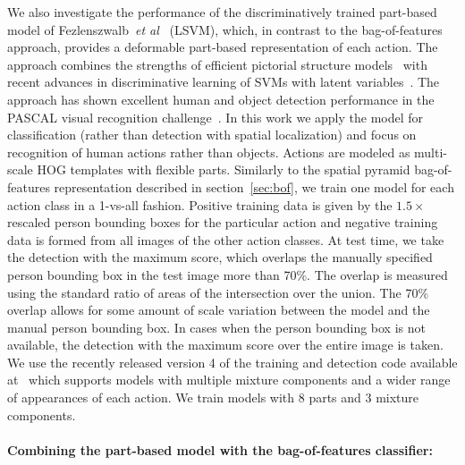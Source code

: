 \documentclass{bmvc2k}
\def\etal{\emph{et al}\bmvaOneDot}
\newcommand{\parnspc}{\vspace*{-4.2mm}}     %
\begin{document}
We also investigate the performance of the discriminatively trained part-based model
of Fezlenszwalb~\etal~\cite{Felzenszwalb09} (LSVM), which, in contrast to the bag-of-features approach,
provides a deformable part-based representation of each action. The approach combines
the strengths of efficient pictorial structure models~\cite{Felzenszwalb05,Fischler73} with
recent advances in discriminative learning of  SVMs with latent variables~\cite{Felzenszwalb09,Yu09a}. 
The approach has shown excellent human and object detection performance in the PASCAL visual recognition challenge~\cite{Felzenszwalb09}. In this work we apply the model for classification (rather than detection with spatial localization) and focus on recognition of human actions rather than objects.  Actions are modeled as multi-scale HOG templates with flexible parts. Similarly to the spatial pyramid bag-of-features representation described in section~\ref{sec:bof}, we train one model for each action class in a 1-vs-all fashion. Positive training
data is given by the $1.5\times$ rescaled person bounding boxes for the particular action and 
negative training data is formed from all images of the other action classes.
At test time, we take the detection with the maximum
score, which overlaps the manually specified person bounding box in the test image more than 70\%.
The overlap is measured using the standard ratio of areas of the intersection over the union.
The 70\% overlap allows for some amount of scale variation between the model and
the manual person bounding box. In cases when the person bounding box is not available,
the detection with the maximum score over the entire image is taken.
We use the recently released version 4 of the training and detection code available at~\cite{pedro_code}
which supports models with multiple mixture components and %
a wider range of appearances  of each action. 
We train models with 8 parts and 3 mixture components.  %



\parnspc
\paragraph{Combining the part-based model with the bag-of-features classifier:}
\end{document}

